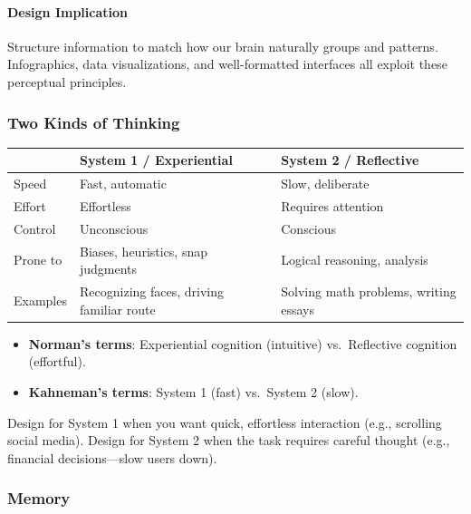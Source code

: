 \paragraph*{Design Implication}
Structure information to match how our brain naturally groups and patterns. Infographics, data visualizations, and well-formatted interfaces all exploit these perceptual principles.

\subsubsection*{Two Kinds of Thinking}

\begin{center}
\renewcommand{\arraystretch}{1.3}
\begin{tabular}{@{} l p{5.5cm} p{5.5cm} @{}}
\toprule
& \textbf{System 1 / Experiential} & \textbf{System 2 / Reflective} \\
\midrule
Speed & Fast, automatic & Slow, deliberate \\
Effort & Effortless & Requires attention \\
Control & Unconscious & Conscious \\
Prone to & Biases, heuristics, snap judgments & Logical reasoning, analysis \\
Examples & Recognizing faces, driving familiar route & Solving math problems, writing essays \\
\bottomrule
\end{tabular}
\end{center}

\begin{itemize}
  \item \textbf{Norman's terms}: Experiential cognition (intuitive) vs.\ Reflective cognition (effortful).
  \item \textbf{Kahneman's terms}: System 1 (fast) vs.\ System 2 (slow).
\end{itemize}

\begin{tipbox}
Design for System 1 when you want quick, effortless interaction (e.g., scrolling social media). Design for System 2 when the task requires careful thought (e.g., financial decisions---slow users down).
\end{tipbox}

\subsubsection*{Memory}

